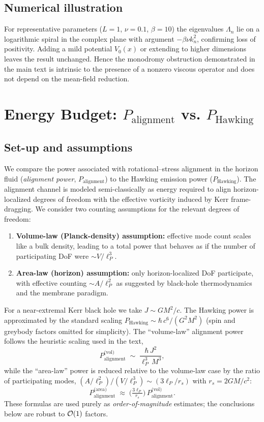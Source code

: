 \documentclass[11pt]{article}
\begin{document}
\subsection*{Numerical illustration}
For representative parameters ($L\!=\!1$, $\nu\!=\!0.1$, $\beta\!=\!10$) the eigenvalues $\Lambda_n$ lie on a logarithmic spiral in the complex plane with argument $-\beta\nu k_n^2$, confirming loss of positivity.
Adding a mild potential $V_0(x)$ or extending to higher dimensions leaves the result unchanged.
Hence the monodromy obstruction demonstrated in the main text is intrinsic to the presence of a nonzero viscous operator and does not depend on the mean-field reduction.

\section{Energy Budget: \texorpdfstring{$P_{\text{alignment}}$}{Palignment} vs. \texorpdfstring{$P_{\text{Hawking}}$}{PHawking}}
\label{app:energy-budget}

\subsection*{Set-up and assumptions}
We compare the power associated with rotational–stress alignment in the horizon fluid
(\emph{alignment power}, $P_{\text{alignment}}$) to the Hawking emission power ($P_{\text{Hawking}}$).
The alignment channel is modeled semi-classically as energy required to align
horizon-localized degrees of freedom with the effective vorticity induced by Kerr
frame-dragging. We consider two counting assumptions for the relevant degrees of freedom:

\begin{enumerate}
  \item \textbf{Volume-law (Planck-density) assumption:} effective mode count scales like a bulk density,
  leading to a total power that behaves as if the number of participating DoF
  were $\sim V/\ell_P^3$.

  \item \textbf{Area-law (horizon) assumption:} only horizon-localized DoF participate, with effective
  counting $\sim A/\ell_P^2$ as suggested by black-hole thermodynamics and the membrane paradigm.
\end{enumerate}

For a near-extremal Kerr black hole we take $J \sim G M^2/c$.
The Hawking power is approximated by the standard scaling
$P_{\text{Hawking}} \sim \hbar\, c^6 / (G^2 M^2)$ (spin and greybody factors omitted for simplicity).
The “volume-law” alignment power follows the heuristic scaling used in the text,
\[
P_{\text{alignment}}^{\text{(vol)}} \;\sim\; \frac{\hbar\,J^2}{\ell_P^3\,M^3},
\]
while the “area-law” power is reduced relative to the volume-law case by the ratio of participating
modes, $(A/\ell_P^2)/(V/\ell_P^3) \sim (3\ell_P/r_s)$ with $r_s=2GM/c^2$:
\[
P_{\text{alignment}}^{\text{(area)}} \;\approx\; \Big(\tfrac{3\ell_P}{r_s}\Big)\,
P_{\text{alignment}}^{\text{(vol)}}.
\]
These formulas are used purely as \emph{order-of-magnitude} estimates; the conclusions below are robust to ${\cal O}(1)$ factors.
\end{document}
